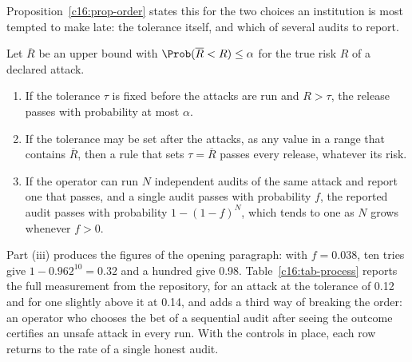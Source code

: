 Proposition~\ref{c16:prop-order} states this for the two choices an institution is
most tempted to make late: the tolerance itself, and which of several audits to
report.

\begin{proposition}\label{c16:prop-order}
Let $\overline{R}$ be an upper bound with $\Prob(\overline{R} < R) \le \alpha$ for the
true risk $R$ of a declared attack.
\begin{enumerate}
\item[(i)] If the tolerance $\tau$ is fixed before the attacks are run and
$R > \tau$, the release passes with probability at most $\alpha$.
\item[(ii)] If the tolerance may be set after the attacks, as any value in a range
that contains $\overline{R}$, then a rule that sets $\tau = \overline{R}$ passes
every release, whatever its risk.
\item[(iii)] If the operator can run $N$ independent audits of the same attack and
report one that passes, and a single audit passes with probability $f$, the
reported audit passes with probability $1 - (1-f)^N$, which tends to one as $N$
grows whenever $f > 0$.
\end{enumerate}
\end{proposition}

Part (iii) produces the figures of the opening paragraph: with $f = 0.038$, ten tries
give $1 - 0.962^{10} = 0.32$ and a hundred give 0.98. Table~\ref{c16:tab-process}
reports the full measurement from the repository, for an attack at the tolerance of
0.12 and for one slightly above it at 0.14, and adds a third way of breaking the order:
an operator who chooses the bet of a sequential audit after seeing the outcome
certifies an unsafe attack in every run. With the controls in place, each row returns
to the rate of a single honest audit.

